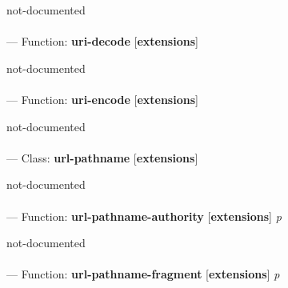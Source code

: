 \begin{adjustwidth}{5em}{5em}
not-documented
\end{adjustwidth}

\paragraph{}
\label{EXTENSIONS:URI-DECODE}
--- Function: \textbf{uri-decode} [\textbf{extensions}] \textit{}

\begin{adjustwidth}{5em}{5em}
not-documented
\end{adjustwidth}

\paragraph{}
\label{EXTENSIONS:URI-ENCODE}
--- Function: \textbf{uri-encode} [\textbf{extensions}] \textit{}

\begin{adjustwidth}{5em}{5em}
not-documented
\end{adjustwidth}

\paragraph{}
\label{EXTENSIONS:URL-PATHNAME}
--- Class: \textbf{url-pathname} [\textbf{extensions}] \textit{}

\begin{adjustwidth}{5em}{5em}
not-documented
\end{adjustwidth}

\paragraph{}
\label{EXTENSIONS:URL-PATHNAME-AUTHORITY}
--- Function: \textbf{url-pathname-authority} [\textbf{extensions}] \textit{p}

\begin{adjustwidth}{5em}{5em}
not-documented
\end{adjustwidth}

\paragraph{}
\label{EXTENSIONS:URL-PATHNAME-FRAGMENT}
--- Function: \textbf{url-pathname-fragment} [\textbf{extensions}] \textit{p}

